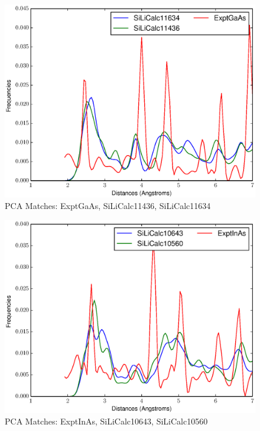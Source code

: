 \documentclass[12pt,letterpaper]{article}
\begin{document}
\begin{figure}[ht]
  \begin{center}
    \includegraphics[scale=0.8]{figs/PC3MatchExptGaAs-SiLiCalc11436-SiLiCalc11634.eps}
  \caption{PCA Matches: ExptGaAs, SiLiCalc11436, SiLiCalc11634}
  \end{center}
\end{figure}

\begin{figure}[ht]
  \begin{center}
    \includegraphics[scale=0.8]{figs/PC3MatchExptInAs-SiLiCalc10643-SiLiCalc10560.eps}
  \caption{PCA Matches: ExptInAs, SiLiCalc10643, SiLiCalc10560}
  \end{center}
\end{figure}
\end{document}
